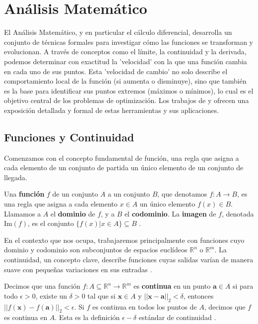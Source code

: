 \newpage

\section{Análisis Matemático}
\label{sec:mathematical_analysis}

El Análisis Matemático, y en particular el cálculo diferencial, desarrolla un conjunto de técnicas formales para investigar cómo las funciones se transforman y evolucionan. A través de conceptos como el límite, la continuidad y la derivada, podemos determinar con exactitud la 'velocidad' con la que una función cambia en cada uno de sus puntos. Esta 'velocidad de cambio' no solo describe el comportamiento local de la función (si aumenta o disminuye), sino que también es la base para identificar sus puntos extremos (máximos o mínimos), lo cual es el objetivo central de los problemas de optimización. Los trabajos de \citet{Rudin1976} y \citet{Apostol1974} ofrecen una exposición detallada y formal de estas herramientas y sus aplicaciones.

\subsection{Funciones y Continuidad}
\label{subsec:functions_continuity}

Comenzamos con el concepto fundamental de función, una regla que asigna a cada elemento de un conjunto de partida un único elemento de un conjunto de llegada.

\begin{definition}[Función]
\label{def:function}
Una \textbf{función} $f$ de un conjunto $A$ a un conjunto $B$, que denotamos $f: A \to B$, es una regla que asigna a cada elemento $x \in A$ un único elemento $f(x) \in B$. Llamamos a $A$ el \textbf{dominio} de $f$, y a $B$ el \textbf{codominio}. La \textbf{imagen} de $f$, denotada $\text{Im}(f)$, es el conjunto $\{f(x) | x \in A\} \subseteq B$ \citep{Apostol1974}.
\end{definition}

En el contexto que nos ocupa, trabajaremos principalmente con funciones cuyo dominio y codominio son subconjuntos de espacios euclídeos $\mathbb{R}^n$ o $\mathbb{R}^m$. La continuidad, un concepto clave, describe funciones cuyas salidas varían de manera suave con pequeñas variaciones en sus entradas \citep{Rudin1976}.

\begin{definition}[Continuidad]
\label{def:continuity}
Decimos que una función $f: A \subseteq \mathbb{R}^n \to \mathbb{R}^m$ es \textbf{continua} en un punto $\mathbf{a} \in A$ si para todo $\epsilon > 0$, existe un $\delta > 0$ tal que si $\mathbf{x} \in A$ y $||\mathbf{x} - \mathbf{a}||_2 < \delta$, entonces $||f(\mathbf{x}) - f(\mathbf{a})||_2 < \epsilon$. Si $f$ es continua en todos los puntos de $A$, decimos que $f$ es continua en $A$. Esta es la definición $\epsilon-\delta$ estándar de continuidad \citep{Apostol1974, Rudin1976}.
\end{definition}

